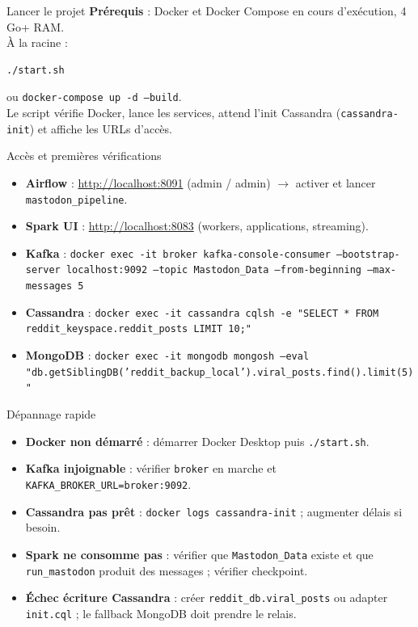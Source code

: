 \documentclass[11pt,aspectratio=169]{beamer}
\begin{document}
\begin{frame}{Lancer le projet}
  \textbf{Prérequis} : Docker et Docker Compose en cours d'exécution, 4 Go+ RAM.\\
  \vspace{0.3em}
  À la racine :
  \begin{lstlisting}[language=bash]
./start.sh
  \end{lstlisting}
  ou \texttt{docker-compose up -d --build}.\\
  \vspace{0.3em}
  Le script vérifie Docker, lance les services, attend l'init Cassandra (\texttt{cassandra-init}) et affiche les URLs d'accès.
\end{frame}

\begin{frame}{Accès et premières vérifications}
  \begin{itemize}[leftmargin=*]
    \item \textbf{Airflow} : \url{http://localhost:8091} (admin / admin) $\rightarrow$ activer et lancer \texttt{mastodon\_pipeline}.
    \item \textbf{Spark UI} : \url{http://localhost:8083} (workers, applications, streaming).
    \item \textbf{Kafka} : \texttt{docker exec -it broker kafka-console-consumer --bootstrap-server localhost:9092 --topic Mastodon\_Data --from-beginning --max-messages 5}
    \item \textbf{Cassandra} : \texttt{docker exec -it cassandra cqlsh -e "SELECT * FROM reddit\_keyspace.reddit\_posts LIMIT 10;"}
    \item \textbf{MongoDB} : \texttt{docker exec -it mongodb mongosh --eval "db.getSiblingDB('reddit\_backup\_local').viral\_posts.find().limit(5)"}
  \end{itemize}
\end{frame}

\begin{frame}{Dépannage rapide}
  \small
  \begin{itemize}[leftmargin=*]
    \item \textbf{Docker non démarré} : démarrer Docker Desktop puis \texttt{./start.sh}.
    \item \textbf{Kafka injoignable} : vérifier \texttt{broker} en marche et \texttt{KAFKA\_BROKER\_URL=broker:9092}.
    \item \textbf{Cassandra pas prêt} : \texttt{docker logs cassandra-init} ; augmenter délais si besoin.
    \item \textbf{Spark ne consomme pas} : vérifier que \texttt{Mastodon\_Data} existe et que \texttt{run\_mastodon} produit des messages ; vérifier checkpoint.
    \item \textbf{Échec écriture Cassandra} : créer \texttt{reddit\_db.viral\_posts} ou adapter \texttt{init.cql} ; le fallback MongoDB doit prendre le relais.
  \end{itemize}
\end{frame}
\end{document}
